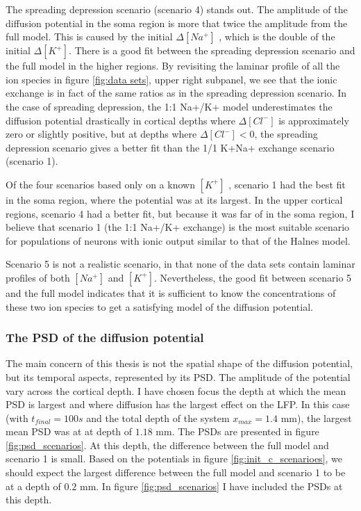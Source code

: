 \documentclass{article}
\begin{document}
The spreading depression scenario (scenario 4) stands out. The amplitude of the diffusion potential in the soma region is more that twice the amplitude from the full model. This is caused by the initial $\Delta [Na^+]$ , which is the double of the initial $\Delta[K^+]$. There is a good fit between the spreading depression scenario and the full model in the higher regions. By revisiting the laminar profile of all the ion species in figure \ref{fig:data sets}, upper right subpanel, we see that the ionic exchange is in fact of the same ratios as in the spreading depression scenario. In the case of spreading depression, the 1:1 Na+/K+ model underestimates the diffusion potential drastically in cortical depths where $\Delta [Cl^-]$ is approximately zero or slightly positive, but at depths where  $\Delta [Cl^-]<0$, the spreading depression scenario gives a better fit than the 1/1 K+Na+ exchange scenario (scenario 1).

Of the four scenarios based only on a known $[K^+]$ , scenario 1 had the best fit in the soma region, where the potential was at its largest. In the upper cortical regions, scenario 4 had a better fit, but because it was far of in the soma region, I believe that scenario 1 (the 1:1 Na+/K+ exchange) is the most suitable scenario for populations of neurons with ionic output similar to that of the Halnes model. 

Scenario 5 is not a realistic scenario, in that none of the data sets contain laminar profiles of both $[Na^+]$ and $[K^+]$. Nevertheless, the good fit between scenario 5 and the full model indicates that it is sufficient to know the concentrations of these two ion species to get a satisfying model of the diffusion potential.

\subsubsection{The PSD of the diffusion potential}
The main concern of this thesis is not the spatial shape of the diffusion potential, but its temporal aspects, represented by its PSD. The amplitude of the potential vary across the cortical depth. I have chosen focus the depth at which the mean PSD is largest and where diffusion has the largest effect on the LFP. In this case (with $t_{final}=100s$ and the total depth of the system $x_{max} = 1.4$ mm), the largest mean PSD was at at depth of $1.18$ mm. The PSDs are presented in figure \ref{fig:psd_scenarios}. At this depth, the difference between the full model and scenario 1 is small. Based on the potentials in figure \ref{fig:init_c_scenarioes}, we should expect the largest difference between the full model and scenario 1 to be at a depth of $0.2$ mm. In figure \ref{fig:psd_scenarios} I have included the PSDs at this depth. 
\end{document}
